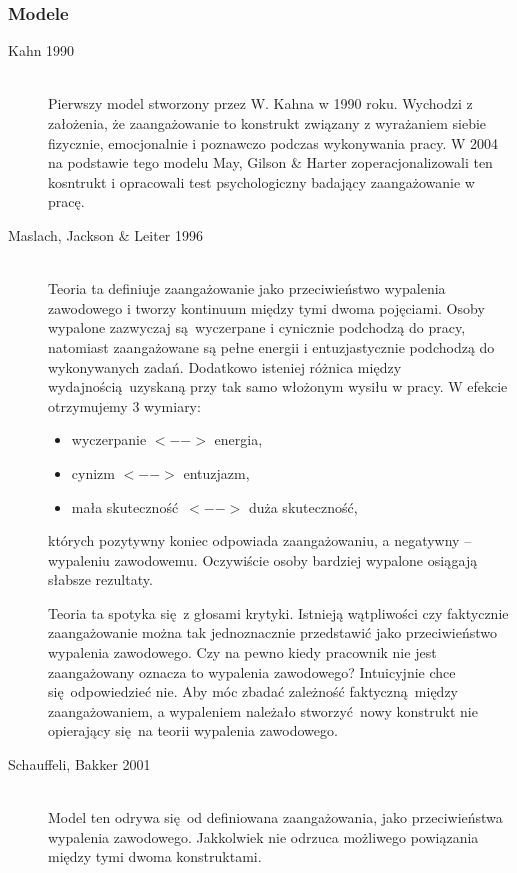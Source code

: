 \subsubsection{Modele}
\begin{description}
\item[Kahn 1990] \hfill \\
Pierwszy model stworzony przez W. Kahna w 1990  roku. Wychodzi z założenia, że zaangażowanie to konstrukt związany z wyrażaniem siebie fizycznie, emocjonalnie i poznawczo podczas wykonywania pracy. W 2004 na podstawie tego modelu May, Gilson \& Harter zoperacjonalizowali ten kosntrukt i opracowali test psychologiczny badający zaangażowanie w pracę.
\item[Maslach, Jackson \& Leiter 1996] \hfill \\
Teoria ta definiuje zaangażowanie jako przeciwieństwo wypalenia zawodowego i tworzy kontinuum między tymi dwoma pojęciami. Osoby wypalone zazwyczaj są wyczerpane i cynicznie podchodzą do pracy, natomiast zaangażowane są pełne energii i entuzjastycznie podchodzą do wykonywanych zadań. Dodatkowo isteniej różnica między wydajnością uzyskaną przy tak samo włożonym wysiłu w pracy. W efekcie otrzymujemy 3 wymiary:
\begin{itemize}
\item wyczerpanie $<-->$ energia,
\item cynizm $<-->$ entuzjazm,
\item mała skuteczność $<-->$ duża skuteczność,
\end{itemize}
których pozytywny koniec odpowiada zaangażowaniu, a negatywny -- wypaleniu zawodowemu. Oczywiście osoby bardziej wypalone osiągają słabsze rezultaty.

Teoria ta spotyka się z głosami krytyki. Istnieją wątpliwości czy faktycznie zaangażowanie można tak jednoznacznie przedstawić jako przeciwieństwo wypalenia zawodowego. Czy na pewno kiedy pracownik nie jest zaangażowany oznacza to wypalenia zawodowego? Intuicyjnie chce się odpowiedzieć nie. Aby móc zbadać zależność faktyczną między zaangażowaniem, a wypaleniem należało stworzyć nowy konstrukt nie opierający się na teorii wypalenia zawodowego.

\item[Schauffeli, Bakker 2001] \hfill \\
Model ten odrywa się od definiowana zaangażowania, jako przeciwieństwa wypalenia zawodowego. Jakkolwiek nie odrzuca możliwego powiązania między tymi dwoma konstruktami. 


\end{description}
